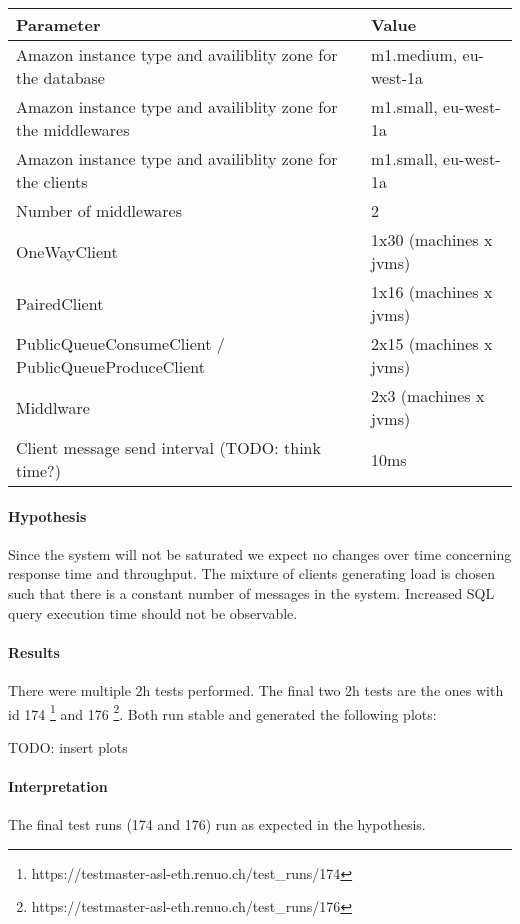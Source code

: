 \documentclass[milestone1.tex]{subfiles}
\begin{document}
\begin{tabular}{|l|l|}
\hline 
Parameter & Value \\
\hline 
Amazon instance type and availiblity zone for the database & m1.medium, eu-west-1a \\ 
Amazon instance type and availiblity zone for the middlewares & m1.small, eu-west-1a \\ 
Amazon instance type and availiblity zone for the clients & m1.small, eu-west-1a \\ 
Number of middlewares & 2 \\ 
OneWayClient & 1x30 (machines x jvms) \\ 
PairedClient & 1x16 (machines x jvms) \\ 
PublicQueueConsumeClient / PublicQueueProduceClient & 2x15 (machines x jvms) \\
Middlware & 2x3 (machines x jvms) \\ 
Client message send interval (TODO: think time?) & 10ms \\
\hline 
\end{tabular}

\paragraph{Hypothesis}
Since the system will not be saturated we expect no changes over time concerning response time and throughput. The mixture of clients generating load is chosen such that there is a constant number of messages in the system. Increased SQL query execution time should not be observable.

\paragraph{Results}
There were multiple 2h tests performed. The final two 2h tests are the ones with id 174 \footnote{https://testmaster-asl-eth.renuo.ch/test\_runs/174} and 176 \footnote{https://testmaster-asl-eth.renuo.ch/test\_runs/176}. Both run stable and generated the following plots:

TODO: insert plots

\paragraph{Interpretation}
The final test runs (174 and 176) run as expected in the hypothesis.

\end{document}
